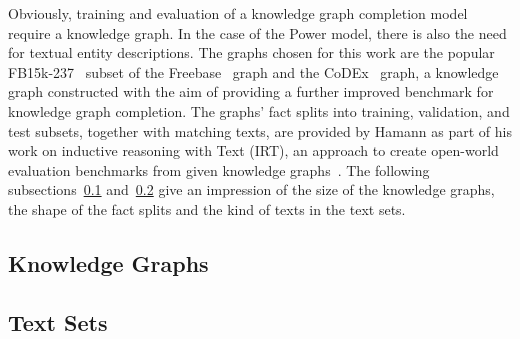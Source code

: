 Obviously, training and evaluation of a knowledge graph completion model require a knowledge graph. In the case of the Power model, there is also the need for textual entity descriptions. The graphs chosen for this work are the popular FB15k-237~\cite{Toutanova2015ObservedVL} subset of the  Freebase~\cite{Bollacker2008FreebaseAC} graph and the CoDEx~\cite{Safavi2020CoDExAC} graph, a knowledge graph constructed with the aim of providing a further improved benchmark for knowledge graph completion. The graphs' fact splits into training, validation, and test subsets, together with matching texts, are provided by Hamann as part of his work on inductive reasoning with Text (IRT), an approach to create open-world evaluation benchmarks from given knowledge graphs~\cite{IRT}. The following subsections~\ref{subsec:5_experiments/1_data_sources/1_knowledge_graphs} and~\ref{subsec:5_experiments/1_data_sources/2_text_sets} give an impression of the size of the knowledge graphs, the shape of the fact splits and the kind of texts in the text sets.

\subsection{Knowledge Graphs}
\label{subsec:5_experiments/1_data_sources/1_knowledge_graphs}


\subsection{Text Sets}
\label{subsec:5_experiments/1_data_sources/2_text_sets}

